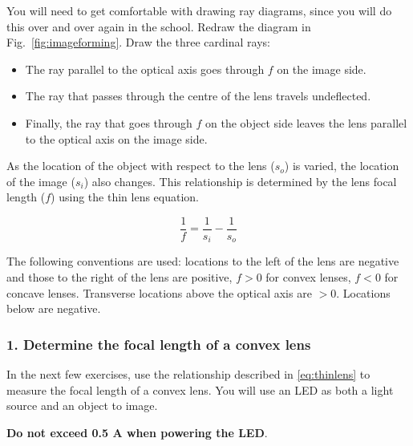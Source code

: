 \documentclass[a4paper]{report}
\begin{document}
You will need to get comfortable with drawing ray diagrams, since you will do this over and over again in the school.
Redraw the diagram in Fig.~\ref{fig:imageforming}.
Draw the three cardinal rays:
\begin{itemize}
\item The ray parallel to the optical axis goes through $f$ on the image side.
\item The ray that passes through the centre of the lens travels undeflected.
\item Finally, the ray that goes through $f$ on the object side leaves the lens parallel to the optical axis on the image side. 
\end{itemize}

As the location of the object with respect to the lens ($s_o$) is varied, the location of the image ($s_i$) also changes. This relationship is determined by the lens focal length ($f$) using the thin lens equation.

\begin{equation}
\frac{1}{f} = \frac{1}{s_i} - \frac{1}{s_o}
\label{eq:thinlens}
\end{equation}

The following conventions are used: locations to the left of the lens are negative and those to the right of the lens are positive, $f>0$ for convex lenses, $f<0$ for concave lenses.
Transverse locations above the optical axis are $>0$. Locations below are negative. 

\vspace{2.5em}



\clearpage




\subsubsection{1. Determine the focal length of a convex lens }
In the next few exercises, use the relationship described in \ref{eq:thinlens} to measure the focal length of a convex lens. You will use an LED as both a light source and an object to image. 
\vspace{1em}

\textbf{Do not exceed 0.5 A when powering the LED}.
\vspace{1em}

%
\end{document}
